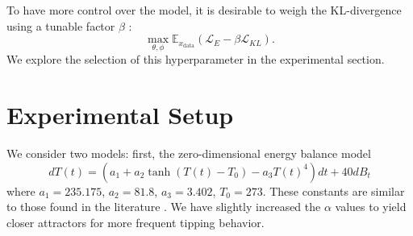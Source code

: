 \documentclass[twoside,11pt]{article}
\begin{document}
To have more control over the model, it is desirable to weigh the KL-divergence using a tunable factor \(\beta\) \citep{higgins2016beta, li2020scalable}: \[ \max_{\theta, \phi} \mathbb{E}_{x_{\text{data}}} (\mathcal{L}_E - \beta \mathcal{L}_{KL}). \] We explore the selection of this hyperparameter in the experimental section.






\section{Experimental Setup}

We consider two models: first, the zero-dimensional energy balance model
\[
    dT(t) = (a_1 + a_2 \tanh (T(t) - T_0) - a_3 T(t)^4) dt + 40 d B_t
\]
where \(a_1 = 235.175\), \(a_2 = 81.8\), \(a_3 = 3.402\), \(T_0 = 273\).
These constants are similar to those found in the literature \citep{fraedrich1979catastrophes, ghil1976climate, sutera}. We have slightly increased the \(\alpha\) values to yield closer attractors for more frequent tipping behavior.
\end{document}
